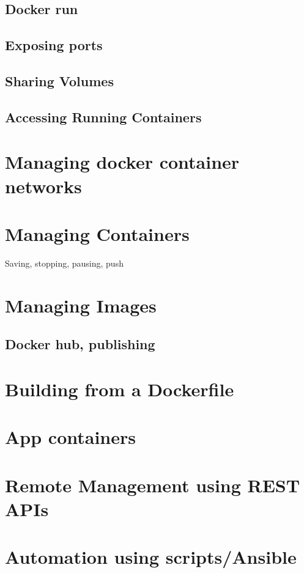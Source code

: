 \documentclass{report}
\begin{document}
\subsection*{Docker run}
\subsection*{Exposing ports}
\subsection*{Sharing Volumes}
\subsection*{Accessing Running Containers}	

\section*{Managing docker container networks}

\section*{Managing Containers}
		
Saving, stopping, pausing, push

\section*{Managing Images}
	
\subsection*{Docker hub, publishing}

\section*{Building from a Dockerfile}

\section*{App containers}

\section*{Remote Management using REST APIs}

\section*{Automation using scripts/Ansible}
\end{document}

